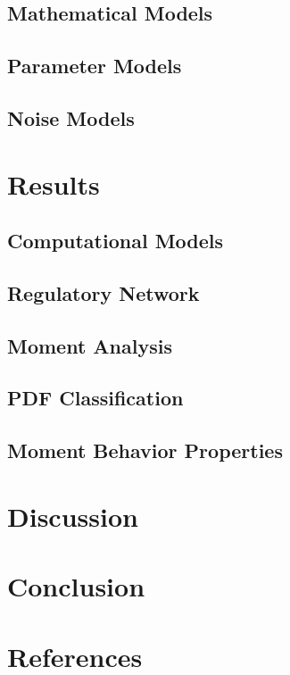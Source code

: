 \subsection{Mathematical Models}

\subsection{Parameter Models}

\subsection{Noise Models}


\section{Results}


\subsection{Computational Models}


\subsection{Regulatory Network}


\subsection{Moment Analysis}


\subsection{PDF Classification}


\subsection{Moment Behavior Properties}


\section{Discussion}


\section{Conclusion}


\section{References}




